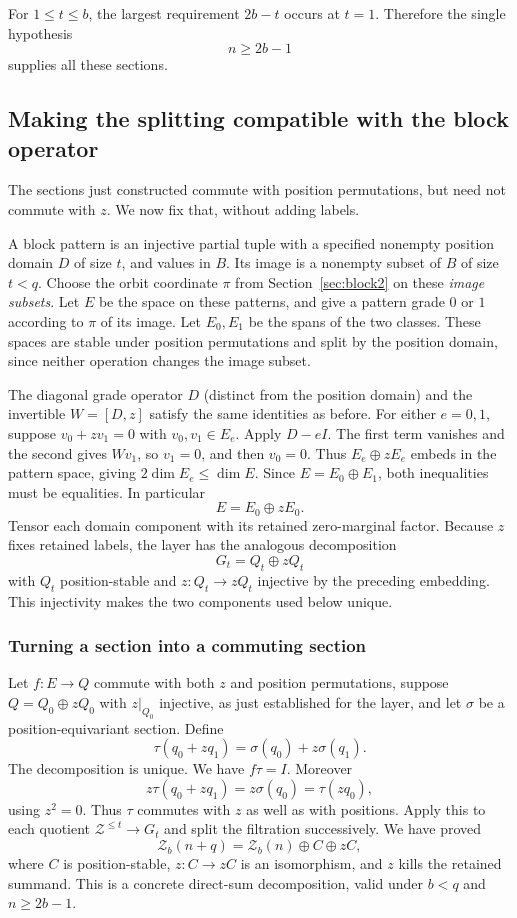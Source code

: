 For $1\le t\le b$, the largest requirement $2b-t$ occurs at $t=1$. Therefore the single hypothesis
\begin{equation}\label{eq:linearlabel}n\ge2b-1\end{equation}
supplies all these sections.

\subsection{Making the splitting compatible with the block operator}\label{sec:blocksplitting}
The sections just constructed commute with position permutations, but need not commute with $z$. We now fix that, without adding labels.

A block pattern is an injective partial tuple with a specified nonempty position domain $D$ of size $t$, and values in $B$. Its image is a nonempty subset of $B$ of size $t<q$. Choose the orbit coordinate $\pi$ from Section~\ref{sec:block2} on these \emph{image subsets}. Let $E$ be the space on these patterns, and give a pattern grade $0$ or $1$ according to $\pi$ of its image. Let $E_0,E_1$ be the spans of the two classes. These spaces are stable under position permutations and split by the position domain, since neither operation changes the image subset.

The diagonal grade operator $D$ (distinct from the position domain) and the invertible $W=[D,z]$ satisfy the same identities as before. For either $e=0,1$, suppose $v_0+zv_1=0$ with $v_0,v_1\in E_e$. Apply $D-eI$. The first term vanishes and the second gives $Wv_1$, so $v_1=0$, and then $v_0=0$. Thus $E_e\oplus zE_e$ embeds in the pattern space, giving $2\dim E_e\le\dim E$. Since $E=E_0\oplus E_1$, both inequalities must be equalities. In particular
\[E=E_0\oplus zE_0.
\]
Tensor each domain component with its retained zero-marginal factor. Because $z$ fixes retained labels, the layer has the analogous decomposition
\[G_t=Q_t\oplus zQ_t
\]
with $Q_t$ position-stable and $z:Q_t\to zQ_t$ injective by the preceding embedding. This injectivity makes the two components used below unique.

\subsubsection{Turning a section into a commuting section}
Let $f:E\to Q$ commute with both $z$ and position permutations,
suppose $Q=Q_0\oplus zQ_0$ with $z|_{Q_0}$ injective, as just
established for the layer, and let $\sigma$ be a position-equivariant
section. Define
\[\tau(q_0+zq_1)=\sigma(q_0)+z\sigma(q_1).
\]
The decomposition is unique. We have $f\tau=I$. Moreover
\[z\tau(q_0+zq_1)=z\sigma(q_0)=\tau(zq_0),
\]
using $z^2=0$. Thus $\tau$ commutes with $z$ as well as with positions. Apply this to each quotient $\mathcal Z^{\le t}\to G_t$ and split the filtration successively. We have proved
\begin{equation}\label{eq:socsplit2}
\mathcal Z_b(n+q)=\mathcal Z_b(n)\oplus C\oplus zC,
\end{equation}
where $C$ is position-stable, $z:C\to zC$ is an isomorphism, and $z$ kills the retained summand. This is a concrete direct-sum decomposition, valid under $b<q$ and $n\ge2b-1$.

